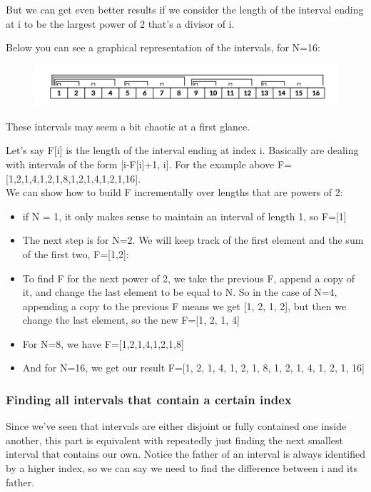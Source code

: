 \documentclass{article}
\begin{document}
But we can get even better results if we consider the length of the interval ending at i to be the largest power of 2 that's a divisor of i.

Below you can see a graphical representation of the intervals, for N=16:

\begin{figure}[h!]
\includegraphics[scale=0.7]{aib_foto.jpg}
\end{figure}

These intervals may seem a bit chaotic at a first glance. 
\newline

\indent Let's say F$[$i$]$  is the length of the interval ending at index i. Basically are dealing with intervals of the form [i-F[i]+1, i]. For the example above F=[1,2,1,4,1,2,1,8,1,2,1,4,1,2,1,16]. 
\\
\indent We can show how to build F incrementally over lengths that are powers of 2:

\begin{itemize}
    \item if N = 1, it only makes sense to maintain an interval of length 1, so F=[1]
    \item The next step is for N=2. We will keep track of the first element and the sum of the first two, F=[1,2]:
    \item To find F for the next power of 2, we take the previous F, append a copy of it, and change the last element to be equal to N. So in the case of N=4, appending a copy to the previous F means we get [1, 2, 1, 2], but then we change the last element, so the new F=[1, 2, 1, 4]
    \item For N=8, we have F=[1,2,1,4,1,2,1,8]
    \item And for N=16, we get our result F=[1, 2, 1, 4, 1, 2, 1, 8, 1, 2, 1, 4, 1, 2, 1, 16]
\end{itemize}

\subsubsection{Finding all intervals that contain a certain index
}

\indent Since we've seen that intervals are either disjoint or fully contained one inside another, this part is equivalent with repeatedly just finding the next smallest interval that contains our own. Notice the father of an interval is always identified by a higher index, so we can say we need to find the difference between i and its father.
\end{document}
